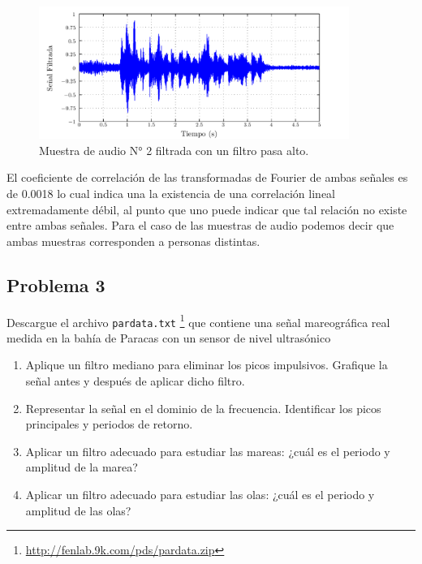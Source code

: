 \documentclass[a4paper,12pt,final]{article}
\begin{document}
      \begin{figure}[H]
        \begin{center}
          \caption{Muestra de audio N° 2 filtrada con un filtro pasa alto.}
          \label{p2f6}
          \vspace{-1em}
          \includegraphics[width=0.9\textwidth]{./laboratorio_5/problema02_sample02_highpass_filtered_signal.pdf}
        \end{center}
      \end{figure}
      \vfill

      \newpage
      \noindent El coeficiente de correlación de las transformadas de Fourier
      de ambas señales es de 0.0018 lo cual indica una la existencia de
      una correlación lineal extremadamente débil, al punto que uno puede
      indicar que tal relación no existe entre ambas señales. Para el caso de
      las muestras de audio podemos decir que ambas muestras corresponden a
      personas distintas.

  \newpage
  \subsection*{Problema 3}
    \noindent Descargue el archivo \texttt{pardata.txt}
      \footnote{\url{http://fenlab.9k.com/pds/pardata.zip}} que contiene una
      señal mareográfica real medida en la bahía de Paracas con un sensor
      de nivel ultrasónico

      \begin{enumerate}[label=\alph*)]
        \item Aplique un filtro mediano para eliminar los picos impulsivos. Grafique la señal antes y después de aplicar dicho filtro.
        \item Representar la señal en el dominio de la frecuencia. Identificar los picos principales y periodos de retorno.
        \item Aplicar un filtro adecuado para estudiar las mareas: ¿cuál es el periodo y amplitud de la marea?
        \item Aplicar un filtro adecuado para estudiar las olas: ¿cuál es el periodo y amplitud de las olas?
      \end{enumerate}
\end{document}
